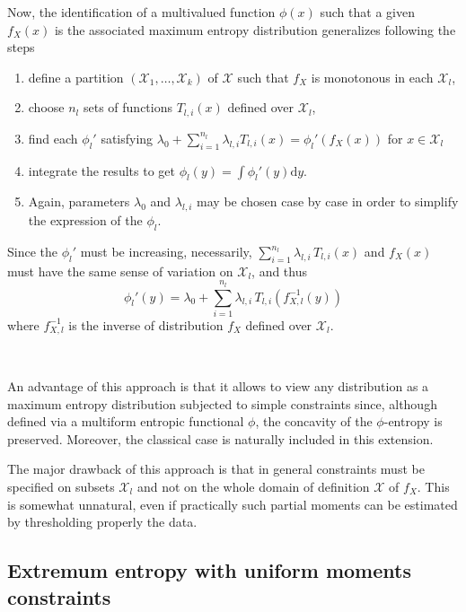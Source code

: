 \documentclass[english,onecolumn]{elsarticle}
\def\d{\mathrm{d}}
\def\X{\mathcal{X}}
\begin{document}
Now, the  identification of a multivalued  function $\phi(x)$ such  that a given
$f_X(x)$ is  the associated  maximum entropy distribution  generalizes following
the steps
%
\begin{enumerate}
\item  define  a partition  $(\X_1,\ldots,\X_k)$  of  $\X$  such that  $f_X$  is
  monotonous in each $\X_l$,
%
\item choose $n_l$ sets of functions $T_{l,i}(x)$ defined over $\X_l$,
%
\item find each $\phi_l'$ satisfying $\displaystyle \lambda_0 + \sum_{i=1}^{n_l}
  \lambda_{l,i} T_{l,i}(x) = \phi_l'(f_X(x))$ for $x \in \X_l$
%
\item integrate the results to get $\displaystyle \phi_l(y) = \int \phi_l'(y) \d
  y$.
% 
\item Again, parameters  $\lambda_0$ and $\lambda_{l,i}$ may be  chosen case by
  case in order to simplify the expression of the $\phi_l$.
\end{enumerate}

Since   the   $\phi_l'$   must   be  increasing,   necessarily,   $\displaystyle
\sum_{i=1}^{n_l} \lambda_{l,i}  \, T_{l,i}(x)$ and  $f_X(x)$ must have  the same
sense of variation on $\X_l$, and thus
%
\begin{equation}
\phi_l'(y) = \lambda_0 + \sum_{i=1}^{n_l} \lambda_{l,i} \, T_{l,i} \! \left(
f_{X,l}^{-1}(y) \right)
\label{eq:derivative-phil-concave}
\end{equation}
%
where $f_{X,l}^{-1}$ is the inverse of distribution $f_X$ defined over $\X_l$.

\

An advantage of  this approach is that  it allows to view any  distribution as a
maximum  entropy distribution  subjected  to simple  constraints since,  although
defined  via  a multiform  entropic  functional  $\phi$,  the concavity  of  the
$\phi$-entropy is preserved. Moreover,  the classical case is naturally included
in this extension.

The  major drawback  of this  approach is  that in  general constraints  must be
specified on  subsets $\X_l$ and not on  the whole domain of  definition $\X$ of
$f_X$. This is somewhat unnatural,  even if practically such partial moments can
be estimated by  thresholding properly the data.



\subsection{Extremum entropy with uniform moments constraints}
\label{subsec:ExtremalPhiEnt}
\end{document}
